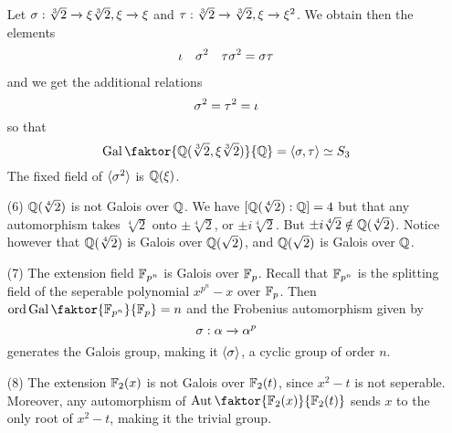 \begin{example}
\begin{enumerate}
            Let $\sigma:\sqrt[3]{2} \xrightarrow{} \xi\sqrt[3]{2}, \xi
            \xrightarrow{} \xi$ and $\tau:\sqrt[3]{2} \xrightarrow{} \sqrt[3]{2},
            \xi \xrightarrow{} \xi^2$. We obtain then the elements
            \begin{align*}
                \iota  &&  \sigma^2    &&  \tau\sigma^2=\sigma\tau \\
            \end{align*}
            and we get the additional relations
            \begin{equation*}
                \sigma^2=\tau^2=\iota
            \end{equation*}
            so that
            \begin{equation*}
                \Gal{\faktor{\Q(\sqrt[3]{2}, \xi\sqrt[3]{2})}{\Q}}=
                \langle \s,\t \rangle \simeq S_3
            \end{equation*}
            The fixed field of $\langle \sigma^2 \rangle$ is $\mathbb{Q}(\xi)$.

        \item[(6)] $\mathbb{Q}(\sqrt[4]{2})$ is not Galois over $\mathbb{Q}$. We have
            $[\mathbb{Q}(\sqrt[4]{2}) : \mathbb{Q}]=4$ but that any automorphism takes
            $\sqrt[4]{2}$ onto $\pm \sqrt[4]{2}$, or $\pm i\sqrt[4]{2}$. But
            $\pm i\sqrt[4]{2} \notin \mathbb{Q}(\sqrt[4]{2})$. Notice however that
            $\mathbb{Q}(\sqrt[4]{2})$ is Galois over $\mathbb{Q}(\sqrt{2})$, and $\mathbb{Q}(\sqrt{2})$
            is Galois over $\mathbb{Q}$.

        \item[(7)] The extension field $\mathbb{F}_{p^n}$ is Galois over $\mathbb{F}_p$.  Recall
            that $\mathbb{F}_{p^n}$ is the splitting field of the seperable polynomial
            $x^{p^n}-x$ over $\mathbb{F}_p$. Then
            $\ord{\Gal{\faktor{\F_{p^n}}{\F_p}}}=n$ and the Frobenius
            automorphism given by
            \begin{equation*}
                \sigma:\alpha \xrightarrow{} \alpha^p
            \end{equation*}
            generates the Galois group, making it $\langle \sigma \rangle$, a cyclic
            group of order $n$.

        \item[(8)] The extension $\mathbb{F}_2(x)$ is not Galois over $\mathbb{F}_2(t)$, since
            $x^2-t$ is not seperable. Moreover, any automorphism of
            $\Aut{\faktor{\F_2(x)}{\F_2(t)}}$ sends $x$ to the only root of
            $x^2-t$, making it the trivial group.
    \end{enumerate}
\end{example}
